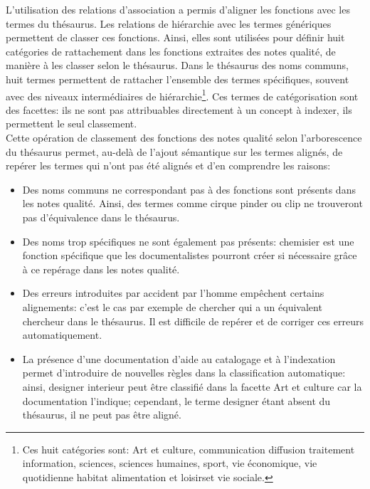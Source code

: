 L'utilisation des relations d'association a permis d'aligner les fonctions avec les termes du thésaurus. Les relations de hiérarchie avec les termes génériques permettent de classer ces fonctions. Ainsi, elles sont utilisées pour définir huit catégories de rattachement dans les fonctions extraites des notes qualité, de manière à les classer selon le thésaurus. Dans le thésaurus des noms communs, huit termes permettent de rattacher l'ensemble des termes spécifiques, souvent avec des niveaux intermédiaires de hiérarchie\footnote{Ces huit catégories sont: \og Art et culture\fg{}, \og communication diffusion traitement information\fg{}, \og sciences\fg{}, \og sciences humaines\fg{}, \og sport\fg{}, \og vie économique\fg{}, \og vie quotidienne habitat alimentation et loisirs\fg et \og vie sociale\fg{}.}. Ces termes de catégorisation sont des facettes: ils ne sont pas attribuables directement à un concept à indexer, ils permettent le seul classement.\\

Cette opération de classement des fonctions des notes qualité selon l'arborescence du thésaurus permet, au-delà de l'ajout sémantique sur les termes alignés, de repérer les termes qui n'ont pas été alignés et d'en comprendre les raisons:
\begin{itemize}
	\item Des noms communs ne correspondant pas à des fonctions sont présents dans les notes qualité. Ainsi, des termes comme \og cirque pinder\fg{} ou \og clip
	\fg{} ne trouveront pas d'équivalence dans le thésaurus.
	\item Des noms trop spécifiques ne sont également pas présents: \og chemisier\fg{} est une fonction spécifique que les documentalistes pourront créer si nécessaire grâce à ce repérage dans les notes qualité.
	\item Des erreurs introduites par accident par l'homme empêchent certains alignements: c'est le cas par exemple de \og chercher\fg{} qui a un équivalent \og chercheur\fg{} dans le thésaurus. Il est difficile de repérer et de corriger ces erreurs automatiquement.
	\item La présence d'une documentation d'aide au catalogage et à l'indexation permet d'introduire de nouvelles règles dans la classification automatique: ainsi, \og designer interieur\fg{} peut être classifié dans la facette \og Art et culture\fg{} car la documentation l'indique; cependant, le terme \og designer\fg{} étant absent du thésaurus, il ne peut pas être aligné.
\end{itemize}

